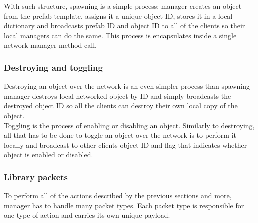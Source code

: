 \documentclass[times, utf8, diplomski]{fer}
\begin{document}
With such structure, spawning is a simple process: manager creates an object from the prefab template, assigns it a unique object ID, stores it in a local dictionary and broadcasts prefab ID and object ID to all of the clients so their local managers can do the same. This process is encapsulates inside a single network manager method call.

\subsubsection{Destroying and toggling}
Destroying an object over the network is an even simpler process than spawning - manager destroys local networked object by ID and simply broadcasts the destroyed object ID so all the clients can destroy their own local copy of the object. \\

Toggling is the process of enabling or disabling an object. Similarly to destroying, all that has to be done to toggle an object over the network is to perform it locally and broadcast to other clients object ID and flag that indicates whether object is enabled or disabled.

\subsubsection{Library packets}
To perform all of the actions described by the previous sections and more, manager has to handle many packet types. Each packet type is responsible for one type of action and carries its own unique payload.
\end{document}

